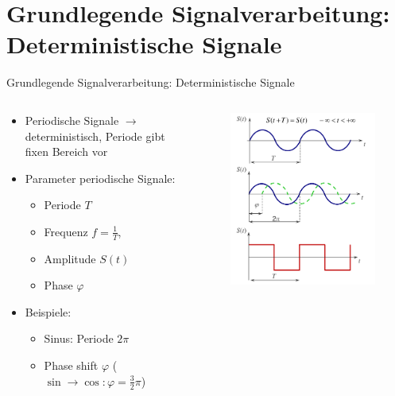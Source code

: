 \documentclass[xcolor=dvipsnames,aspectratio=169]{beamer}
\begin{document}
\section{Grundlegende Signalverarbeitung: Deterministische Signale}
\begin{frame}{Grundlegende Signalverarbeitung: Deterministische Signale}
\begin{columns}[T] %
\begin{column}{.6\textwidth}
\begin{itemize}
	\item Periodische Signale $\to$ deterministisch, Periode gibt fixen Bereich vor
	\item Parameter periodische Signale:
	\begin{itemize}
		\item Periode $T$
		\item Frequenz $f=\frac{1}{T}$, 
		\item Amplitude $S(t)$
		\item Phase $\varphi$
	\end{itemize}
	\item Beispiele:
	\begin{itemize}
		\item Sinus: Periode $2\pi$
		\item Phase shift $\varphi$ ($\sin \to \cos: \varphi= \frac{3}{2} \pi$)
	\end{itemize}
\end{itemize}
\end{column}%
\hfill%
\begin{column}{.4\textwidth}
\vspace*{-.75cm}
\begin{figure}
\includegraphics[scale=0.3]{sigproc}
\end{figure}
\end{column}%
\end{columns}
\end{frame}
\end{document}
